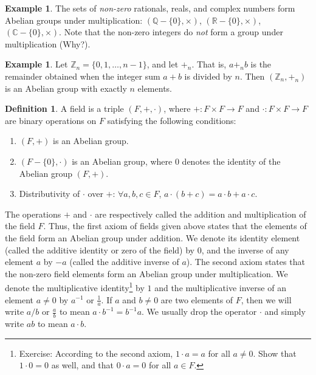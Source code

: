 \documentclass[svgnames]{article}
\theoremstyle{definition}
\newtheorem{Definition}[Theorem]{Definition}
\newtheorem{Example}[Theorem]{Example}
\theoremstyle{remark}
\newcommand{\newterm}[1]{{\color{alertcolor} #1}}
\begin{document}
\begin{Example}\label{ex:AbGrpQ*R*C*}
The sets of \emph{non-zero} rationals, reals, and complex numbers form Abelian groups under multiplication: $(\mathbb Q - \{0\}, \times)$, $(\mathbb R - \{0\}, \times)$, $(\mathbb C - \{0\}, \times)$. Note that the non-zero integers do \emph{not} form a group under multiplication (Why?).
\end{Example}

\begin{Example}\label{ex:AbGrpZn}
Let $\mathbb Z_n = \{0, 1, \ldots, n - 1\}$, and let $+_n$. That is, $a +_n b$ is the remainder obtained when the integer sum $a + b$ is divided by $n$. Then $(\mathbb Z_n, +_n)$ is an Abelian group with exactly $n$ elements.
\end{Example}

\begin{Definition}
A \newterm{field} is a triple $(F, +, \cdot)$, where $+ \colon F \times F \to F$ and $\cdot \colon F \times F \to F$ are binary operations on $F$ satisfying the following conditions:
\begin{enumerate}
\item $(F, +)$ is an Abelian group.
\item $(F - \{0\}, \cdot)$ is an Abelian group, where $0$ denotes the identity of the Abelian group $(F, +)$.
\item Distributivity of $\cdot$ over $+$: $\forall a, b, c \in F$, $a \cdot (b + c) = a \cdot b + a \cdot c$.
\end{enumerate}
\end{Definition}
The operations $+$ and $\cdot$ are respectively called the \newterm{addition} and \newterm{multiplication} of the field $F$. Thus, the first axiom of fields given above states that the elements of the field form an Abelian group under addition. We denote its identity element (called the \newterm{additive identity} or \newterm{zero} of the field) by $0$, and the inverse of any element $a$ by $-a$ (called the \newterm{additive inverse} of $a$). The second axiom states that the non-zero field elements form an Abelian group under multiplication. We  denote the \newterm{multiplicative identity}\footnote{
	Exercise: According to the second axiom, $1 \cdot a = a$ for all $a \ne 0$. Show that $1 \cdot 0 = 0$ as well, and that $0 \cdot a = 0$ for all $a \in F$.}
by $1$ and the \newterm{multiplicative inverse} of an element $a \ne 0$ by $a^{-1}$ or $\frac 1 a$. If $a$ and $b \ne 0$ are two elements of $F$, then we will write $a/b$ or $\frac a b$ to mean $a \cdot b^{-1} = b^{-1}a$. We usually drop the operator $\cdot$ and simply write $ab$ to mean $a \cdot b$.
\end{document}
